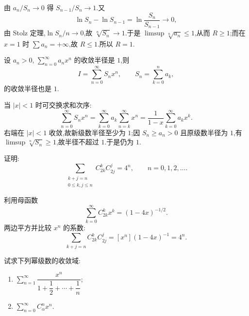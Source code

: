 \begin{solution}
    由 $a_n/S_n\to0$ 得 $S_{n-1}/S_n\to1$.又
    \[
        \ln S_n-\ln S_{n-1}=\ln\dfrac{S_n}{S_{n-1}}\to0,
    \]
    由 Stolz 定理,$\ln S_n/n\to0$,故 $\sqrt[n]{S_n}\to1$.于是
    $\displaystyle\limsup\sqrt[n]{a_n}\leq1$,从而 $R\geq1$;而在 $x=1$ 时
    $\displaystyle\sum a_n=+\infty$,故 $R\leq1$.所以 $R=1$.
\end{solution}

\begin{example}
    设 $a_n>0$, $\displaystyle\sum\limits_{n=0}^{\infty}a_nx^n$ 的收敛半径是 $1$,则
    \[
        I=\sum\limits_{n=0}^{\infty}S_nx^n,
        \qquad
        S_n=\sum\limits_{k=0}^{n}a_k,
    \]
    的收敛半径也是 $1$.
\end{example}
\exampleblank

\begin{solution}
    当 $|x|<1$ 时可交换求和次序:
    \[
        \displaystyle\sum\limits_{n=0}^{\infty}S_nx^n
        =\sum\limits_{k=0}^{\infty}a_k\sum\limits_{n=k}^{\infty}x^n
        =\dfrac{1}{1-x}\sum\limits_{k=0}^{\infty}a_kx^k.
    \]
    右端在 $|x|<1$ 收敛,故新级数半径至少为 $1$;因 $S_n\geq a_n>0$ 且原级数半径为 $1$,有
    $\displaystyle\limsup\sqrt[n]{S_n}\geq1$,故半径不超过 $1$.于是仍为 $1$.
\end{solution}

\begin{example}
    证明:
    \[
        \displaystyle\sum\limits_{\substack{k+j=n\\0\leq k,j\leq n}}C_{2k}^{k}C_{2j}^{j}=4^n,
        \qquad n=0,1,2,\ldots.
    \]
\end{example}
\exampleblank

\begin{solution}
    利用母函数
    \[
        \displaystyle\sum\limits_{k=0}^{\infty}C_{2k}^{k}x^k=(1-4x)^{-1/2}.
    \]
    两边平方并比较 $x^n$ 的系数:
    \[
        \displaystyle\sum\limits_{k+j=n}C_{2k}^{k}C_{2j}^{j}
            =[x^n](1-4x)^{-1}=4^n.
    \]
\end{solution}

\begin{example}
    试求下列幂级数的收敛域:
    \begin{enumerate}
        \item $\displaystyle\sum\limits_{n=1}^{\infty}\dfrac{x^n}{1+\dfrac{1}{2}+\cdots+\dfrac{1}{n}}$;
        \item $\displaystyle\sum\limits_{n=0}^{\infty}C_{\alpha}^{n}x^n$.
    \end{enumerate}
\end{example}
\exampleblank

